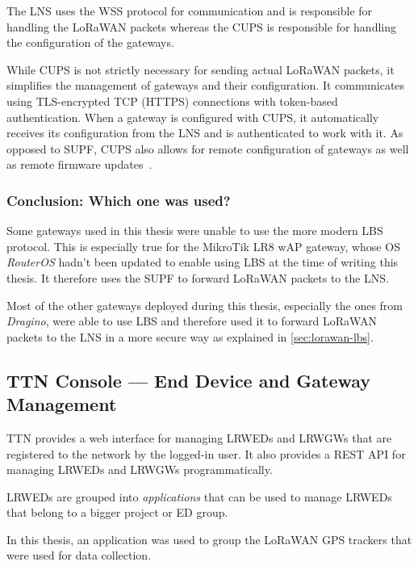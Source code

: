 The \ac{LNS} uses the \ac{WSS} protocol for communication and is responsible for handling the \ac{LoRaWAN} packets whereas the \acl{CUPS} is responsible for handling the configuration of the gateways.

While \ac{CUPS} is not strictly necessary for sending actual \ac{LoRaWAN} packets, it simplifies the management of gateways and their configuration.
It communicates using \ac{TLS}-encrypted \ac{TCP} (\ac{HTTPS}) connections with token-based authentication.
When a gateway is configured with \ac{CUPS}, it automatically receives its configuration from the \ac{LNS} and is authenticated to work with it.
As opposed to \ac{SUPF}, \ac{CUPS} also allows for remote configuration of gateways as well as remote firmware updates~\cite{the_things_industries_bv_lora_2022}.

\subsubsection{Conclusion: Which one was used?}

Some gateways used in this thesis were unable to use the more modern \acl{LBS} protocol.
This is especially true for the MikroTik LR8 wAP gateway, whose \ac{OS} \emph{RouterOS} hadn't been updated to enable using \ac{LBS} at the time of writing this thesis.
It therefore uses the \ac{SUPF} to forward \ac{LoRaWAN} packets to the \ac{LNS}.

Most of the other gateways deployed during this thesis, especially the ones from \emph{Dragino}, were able to use \ac{LBS} and therefore used it to forward \ac{LoRaWAN} packets to the \ac{LNS} in a more secure way as explained in \cref{sec:lorawan-lbs}.

\subsection{\acl{TTN} Console — End Device and Gateway Management}\label{sec:web-interface-and-device-gateway-management}

\ac{TTN} provides a web interface for managing \aclp{LRWED} and \aclp{LRWGW} that are registered to the network by the logged-in user.
It also provides a \ac{REST} \ac{API} for managing \aclp{LRWED} and \aclp{LRWGW} programmatically.

\aclp{LRWED} are grouped into \emph{applications} that can be used to manage \aclp{LRWED} that belong to a bigger project or \acl{ED} group.

In this thesis, an application was used to group the \ac{LoRaWAN} \ac{GPS} trackers that were used for data collection.

